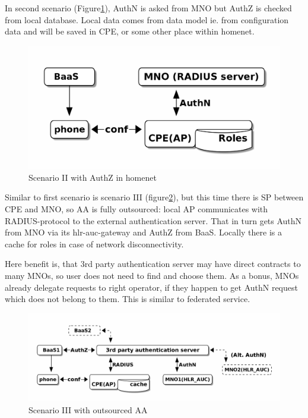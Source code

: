 \documentclass[12pt,a4paper,english]{tutthesis}
\begin{document}
\begin{otherlanguage}{english}
\label{scenario-ii}

In second scenario (Figure\ref{fig:scenario-II}), AuthN is asked from MNO but
AuthZ is checked from local database. Local data comes from data model
ie. from configuration data and will be saved in CPE, or some other
place within homenet.


\begin{figure}[htb]
\centering
\includegraphics[width=.9\linewidth]{scenII.png}
\caption{\label{fig:scenario-II}Scenario II with AuthZ in homenet}
\end{figure}


\label{scenario-iii}

Similar to first scenario is scenario III (figure\ref{fig:scenario-III}), 
but this time there is SP between CPE and MNO, so AA is fully outsourced:
local AP communicates with RADIUS-protocol to the external
authentication server. That in turn gets AuthN from MNO via its
hlr-auc-gateway and AuthZ from BaaS.
Locally there is a cache for roles in case of network disconnectivity.

Here benefit is, that 3rd party authentication server may have direct
contracts to many MNOs, so user does not need to find and choose
them. As a bonus,  MNOs already delegate requests to right operator, if
they happen to get AuthN request which does not belong to them.
This is similar to federated service.

\begin{figure}[htb]
\centering
\includegraphics[width=.9\linewidth]{scenIII.png}
\caption{\label{fig:scenario-III}Scenario III with outsourced AA}
\end{figure}


\end{otherlanguage}
\end{document}

